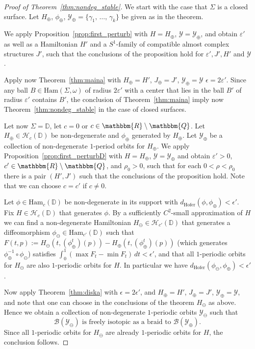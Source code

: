 \documentclass[AHL,Unicode,longabstracts,published]{cedram}
\newcommand{\Q}{\mathbbm{Q}}
\newcommand{\R}{\mathbbm{R}}
\newcommand{\D}{\mathbb{D}}
\newcommand{\Ham}{\mathrm{Ham}}
\newcommand{\hofer}{\mathrm{Hofer}}
\newcommand{\clY}{\mathcal{Y}}
\newcommand{\clB}{\mathcal{B}}
\newcommand{\clH}{\mathcal{H}}
\newcommand{\hofer}{\mathrm{Hofer}}
\begin{document}
\begin{proof}[Proof of Theorem~\ref{thm:nondeg_stable}]
We start with the case that $\Sigma$ is a closed surface. Let $H_{\oplus}$, $\phi_{\oplus}$, $\clY_{\oplus} = \{\gamma_1, \,\ldots,\, \gamma_k\}$ be given as in the theorem.

We apply Proposition~\ref{prop:first_perturb} with $H=H_{\oplus}$, $\clY = \clY_{\oplus}$, and obtain $\varepsilon'$ as well as a Hamiltonian $H'$ and a $S^1$-family of compatible almost complex structures $J'$, such that the conclusions of the proposition hold for $\varepsilon', J', H'$ and $\clY$.

Apply now Theorem~\ref{thm:maina} with $ H_{\oplus} = H'$, $J_{\oplus} = J'$, $\clY_{\oplus} = \clY$ $\epsilon = 2\varepsilon'$. Since any ball $B\in \Ham(\Sigma, \omega)$ of radius $2\varepsilon'$ with a center that lies in the ball $B'$ of radius $\varepsilon'$ contains $B'$, the conclusion of Theorem~\ref{thm:maina} imply now Theorem~\ref{thm:nondeg_stable} in the case of closed surfaces.


Let now $\Sigma = \D$, let $c=0$ or $c\in \R \setminus \Q$. Let $H_{\oplus} \in \clH_c(\D)$ be non-degenerate and $\phi_{\oplus}$ generated by $H_{\oplus}$. Let $\clY_{\oplus}$ be a collection of non-degenerate $1$-period orbits for $H_{\oplus}$. We apply Proposition~\ref{prop:first_perturbD} with $H= H_{\oplus}$, $\clY= \clY_{\oplus}$ and obtain $\varepsilon'>0$, $c'\in \R \setminus \Q$, and $\rho_0>0$, such that for each $0<\rho<\rho_0$ there is a pair $(H', J')$ such that the conclusions of the proposition hold. Note that we can choose $c=c'$ if $c\neq 0$.

Let $\phi \in \Ham_c(\D)$ be non-degenerate in its support with $d_{\hofer}(\phi, \phi_{\oplus}) < \epsilon'$. Fix $H\in \clH_c(\D)$ that generates $\phi$. By a sufficiently $C^2$-small approximation of $H$ we can find a non-degenerate Hamiltonian $H_{\ominus} \in \clH_{c'}(\D)$ that generates a diffeomorphism $\phi_{\ominus}\in \Ham_{c'}(\D)$ such that $F(t,p) := H_\ominus(t,(\phi_\oplus^t)(p)) - H_{\oplus}(t, (\phi_\oplus^t)(p))$ (which generates $\phi_{\oplus}^{-1} \circ \phi_\ominus$) satisfies 
$\int_{0}^1 (\max F_t - \min F_t) \, dt < \epsilon'$, and that all $1$-periodic orbits for $H_{\ominus}$ are also $1$-periodic orbits for $H$. In particular we have $d_{\hofer}(\phi_{\ominus}, \phi_{\oplus})< \epsilon'$.

Now apply Theorem~\ref{thm:diska} with $\epsilon=2\epsilon'$, and $H_{\oplus} = H'$, $J_{\oplus}= J'$, $\clY_{\oplus} = \clY$, and note that one can choose in the conclusions of the theorem $H_{\ominus}$ as above. Hence we obtain a collection of non-degenerate $1$-periodic orbits $\clY_{\ominus}$ such that
\[
\clB(\clY_\ominus) \text{ is freely isotopic as a braid to } \clB(\clY_\oplus).
\]
Since all $1$-periodic orbits for $H_{\ominus}$ are already $1$-periodic orbits for $H$, the conclusion follows.
\end{proof}
\end{document}
